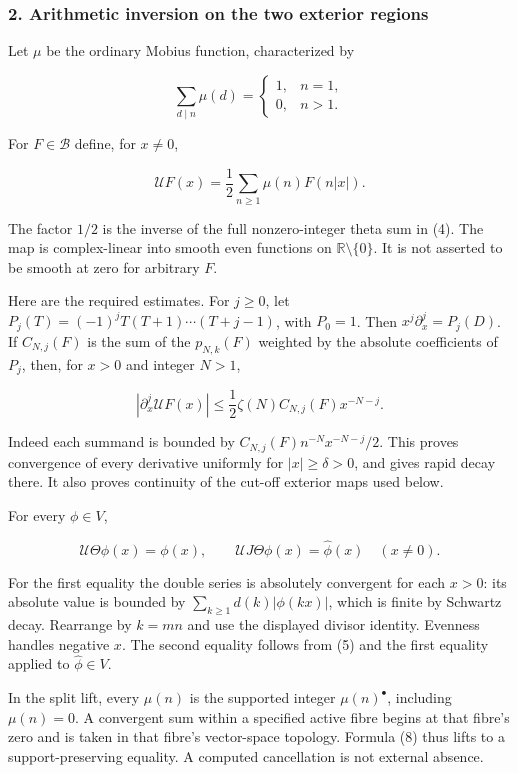 \subsubsection{2. Arithmetic inversion on the two exterior
regions}\label{pr_10:arithmetic-inversion-on-the-two-exterior-regions}

Let \(\mu\) be the ordinary Mobius function, characterized by

\[\sum_{d\mid n}\mu(d)=\begin{cases}1,&n=1,\\0,&n>1.\end{cases}\]

For \(F\in\mathscr B\) define, for \(x\ne0\),

\[\boxed{\mathcal U F(x)=\frac12\sum_{n\ge1}\mu(n)F(n|x|).}\tag{6}\]

The factor \(1/2\) is the inverse of the full nonzero-integer theta sum in (4). The map is
complex-linear into smooth even functions on \(\mathbb R\setminus\{0\}\). It is not asserted to be
smooth at zero for arbitrary \(F\).

Here are the required estimates. For \(j\ge0\), let \(P_j(T)=(-1)^jT(T+1)\cdots(T+j-1)\), with
\(P_0=1\). Then \(x^j\partial_x^j=P_j(D)\). If \(C_{N,j}(F)\) is the sum of the \(p_{N,k}(F)\)
weighted by the absolute coefficients of \(P_j\), then, for \(x>0\) and integer \(N>1\),

\[|\partial_x^j\mathcal U F(x)|
\le\frac12\zeta(N)C_{N,j}(F)x^{-N-j}.\tag{7}\]

Indeed each summand is bounded by \(C_{N,j}(F)n^{-N}x^{-N-j}/2\). This proves convergence of every
derivative uniformly for \(|x|\ge\delta>0\), and gives rapid decay there. It also proves continuity
of the cut-off exterior maps used below.

For every \(\phi\in V\),

\[\boxed{\mathcal U\Theta\phi(x)=\phi(x),\qquad
\mathcal U J\Theta\phi(x)=\widehat\phi(x)\quad(x\ne0).}\tag{8}\]

For the first equality the double series is absolutely convergent for each \(x>0\): its absolute
value is bounded by \(\sum_{k\ge1}d(k)|\phi(kx)|\), which is finite by Schwartz decay. Rearrange by
\(k=mn\) and use the displayed divisor identity. Evenness handles negative \(x\). The second
equality follows from (5) and the first equality applied to \(\widehat\phi\in V\).

In the split lift, every \(\mu(n)\) is the supported integer \(\mu(n)^\bullet\), including
\(\mu(n)=0\). A convergent sum within a specified active fibre begins at that fibre's zero and is
taken in that fibre's vector-space topology. Formula (8) thus lifts to a support-preserving
equality. A computed cancellation is not external absence.

